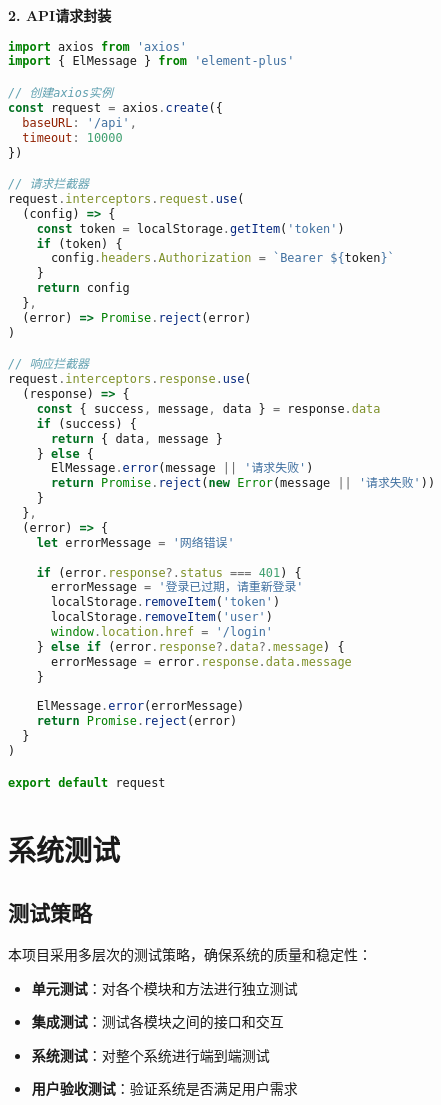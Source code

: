\documentclass[12pt,a4paper]{article}
\begin{document}
\textbf{2. API请求封装}
\begin{lstlisting}[language=javascript]
import axios from 'axios'
import { ElMessage } from 'element-plus'

// 创建axios实例
const request = axios.create({
  baseURL: '/api',
  timeout: 10000
})

// 请求拦截器
request.interceptors.request.use(
  (config) => {
    const token = localStorage.getItem('token')
    if (token) {
      config.headers.Authorization = `Bearer ${token}`
    }
    return config
  },
  (error) => Promise.reject(error)
)

// 响应拦截器
request.interceptors.response.use(
  (response) => {
    const { success, message, data } = response.data
    if (success) {
      return { data, message }
    } else {
      ElMessage.error(message || '请求失败')
      return Promise.reject(new Error(message || '请求失败'))
    }
  },
  (error) => {
    let errorMessage = '网络错误'
    
    if (error.response?.status === 401) {
      errorMessage = '登录已过期，请重新登录'
      localStorage.removeItem('token')
      localStorage.removeItem('user')
      window.location.href = '/login'
    } else if (error.response?.data?.message) {
      errorMessage = error.response.data.message
    }
    
    ElMessage.error(errorMessage)
    return Promise.reject(error)
  }
)

export default request
\end{lstlisting}

\section{系统测试}

\subsection{测试策略}
本项目采用多层次的测试策略，确保系统的质量和稳定性：

\begin{itemize}
    \item \textbf{单元测试}：对各个模块和方法进行独立测试
    \item \textbf{集成测试}：测试各模块之间的接口和交互
    \item \textbf{系统测试}：对整个系统进行端到端测试
    \item \textbf{用户验收测试}：验证系统是否满足用户需求
\end{itemize}
\end{document}
